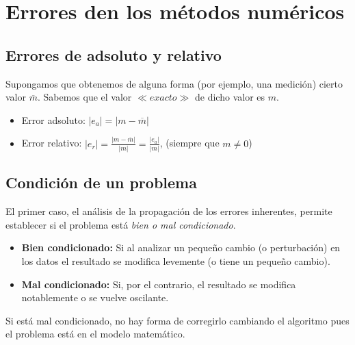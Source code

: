 \documentclass[../main.tex]{subfiles}
\begin{document}
\section{Errores den los métodos numéricos} 
    \subsection{Errores de adsoluto y relativo}
    Supongamos que obtenemos de alguna forma (por ejemplo, una medición) cierto valor $\overline{m}$. Sabemos que el valor $\ll  exacto \gg $ de dicho valor es $m$.
    \begin{itemize}
        \item Error adsoluto: $|e_a| = |m - \overline{m}|$
        \item Error relativo: $|e_r| = \frac{|m - \overline{m}|}{|m|} = \frac{|e_a|}{|m|}$, (siempre que $m \neq 0$)
    \end{itemize}        

    \subsection{Condición de un problema}
        El primer caso, el análisis de la propagación de los errores inherentes, permite establecer si el problema está \textit{bien o mal condicionado}.
        \begin{itemize}
            \item \textbf{Bien condicionado:} Si al analizar un pequeño cambio (o perturbación)
            en los datos el resultado se modifica levemente (o tiene un pequeño cambio).
            \item \textbf{Mal condicionado:} Si, por el contrario, el resultado se modifica notablemente o se vuelve oscilante.
        \end{itemize}

        Si está mal condicionado, no hay forma de corregirlo cambiando el algoritmo pues el problema está en el modelo matemático.
\end{document}
